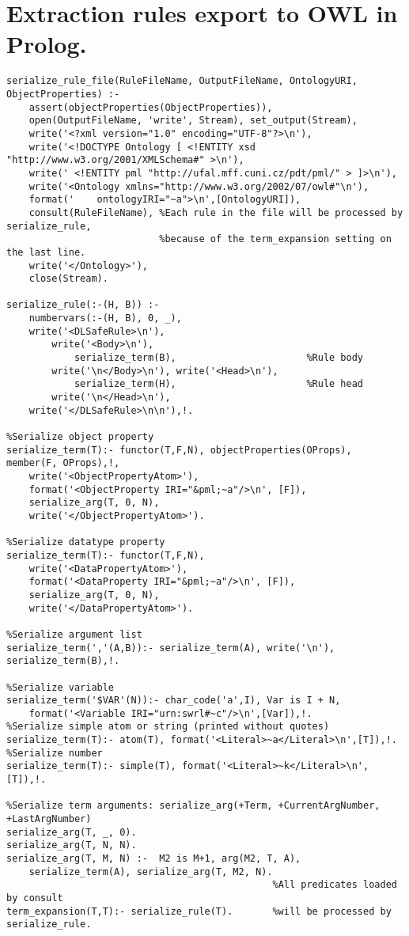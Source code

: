 \pagebreak

\section{Extraction rules export to OWL in Prolog.} \label{sec:onto_prolog_rules_export_module}
\begin{verbatim}
serialize_rule_file(RuleFileName, OutputFileName, OntologyURI, ObjectProperties) :-
	assert(objectProperties(ObjectProperties)),
	open(OutputFileName, 'write', Stream), set_output(Stream),
	write('<?xml version="1.0" encoding="UTF-8"?>\n'),
	write('<!DOCTYPE Ontology [ <!ENTITY xsd "http://www.w3.org/2001/XMLSchema#" >\n'),
	write('	<!ENTITY pml "http://ufal.mff.cuni.cz/pdt/pml/" > ]>\n'),		
	write('<Ontology xmlns="http://www.w3.org/2002/07/owl#"\n'),	
	format('	ontologyIRI="~a">\n',[OntologyURI]),
	consult(RuleFileName), %Each rule in the file will be processed by serialize_rule,
	                       %because of the term_expansion setting on the last line. 	                         
	write('</Ontology>'),			
	close(Stream).

serialize_rule(:-(H, B)) :- 	
	numbervars(:-(H, B), 0, _),	
	write('<DLSafeRule>\n'),		
		write('<Body>\n'),          
			serialize_term(B),                       %Rule body
		write('\n</Body>\n'), write('<Head>\n'),
			serialize_term(H),                       %Rule head
		write('\n</Head>\n'),			
	write('</DLSafeRule>\n\n'),!.
	 
%Serialize object property
serialize_term(T):- functor(T,F,N), objectProperties(OProps), member(F, OProps),!,	
	write('<ObjectPropertyAtom>'),
	format('<ObjectProperty IRI="&pml;~a"/>\n', [F]),
	serialize_arg(T, 0, N),		
	write('</ObjectPropertyAtom>').

%Serialize datatype property
serialize_term(T):- functor(T,F,N),	
	write('<DataPropertyAtom>'),
	format('<DataProperty IRI="&pml;~a"/>\n', [F]),
	serialize_arg(T, 0, N),		
	write('</DataPropertyAtom>').

%Serialize argument list
serialize_term(','(A,B)):- serialize_term(A), write('\n'), serialize_term(B),!.

%Serialize variable
serialize_term('$VAR'(N)):- char_code('a',I), Var is I + N,
	format('<Variable IRI="urn:swrl#~c"/>\n',[Var]),!.
%Serialize simple atom or string (printed without quotes)
serialize_term(T):- atom(T), format('<Literal>~a</Literal>\n',[T]),!.
%Serialize number
serialize_term(T):- simple(T), format('<Literal>~k</Literal>\n',[T]),!.

%Serialize term arguments: serialize_arg(+Term, +CurrentArgNumber, +LastArgNumber)
serialize_arg(T, _, 0).
serialize_arg(T, N, N).
serialize_arg(T, M, N) :-  M2 is M+1, arg(M2, T, A),
	serialize_term(A), serialize_arg(T, M2, N).  
                                               %All predicates loaded by consult
term_expansion(T,T):- serialize_rule(T).       %will be processed by serialize_rule.
\end{verbatim}